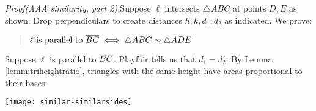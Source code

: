 \begin{tcolorbox}[proofstyle]
	\begin{minipage}[t]{0.63\linewidth}\vspace{0pt}
		\emph{Proof\lstsp (AAA similarity, part 2).}\quad Suppose $\ell$ intersects $\triangle ABC$ at points $D,E$ as shown. Drop perpendiculars to create distances $h,k,d_1,d_2$ as indicated. We prove:
		\begin{quote}
			$\ell\text{ is parallel to }\overline{BC} \iff \triangle ABC\sim\triangle ADE$
		\end{quote}
		\begin{description}\itemsep0pt
			\item[$(\Rightarrow)$] Suppose $\ell$ is parallel to $\overline{BC}$. Playfair\footnotemark{} tells us that $d_1=d_2$. By Lemma \ref{lemm:triheightratio}, triangles with the same height have areas proportional to their bases:
		\end{description}
	\end{minipage}
	\hfill
	\begin{minipage}[t]{0.36\linewidth}\vspace{0pt}
		\flushright
		\texttt{[image: similar-similarsides]}
	\end{minipage}\par
	\vspace{-15pt}


\end{tcolorbox}
